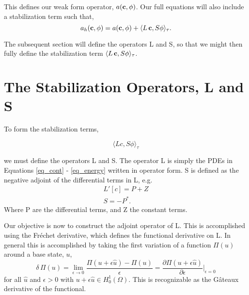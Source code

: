 This defines our weak form operator, $ a({\bf c},{\bf \phi})$. Our full equations will
also include a stabilization term such that,  
\begin{equation}
 a_h({\bf c},{\bf \phi}) = a({\bf c},{\bf \phi}) +  \langle L\,{\bf c},S{\bf \phi} \rangle_\tau. 
\end{equation}

The subsequent section will define the operators L and S, so that we
might then fully define the stabilization term $\langle L\,{\bf c},S{\bf \phi}
\rangle_\tau$. 

%
%
\section{The Stabilization Operators, L and S}


To form the stabilization terms, 

\begin{equation}
 \langle Lc,S\phi \rangle_\tau
\end{equation}

we must define the operators L and S. The operator L is simply the PDEs
in Equations \ref{eq_cont} - \ref{eq_energy} written in operator form. S is
defined as the negative adjoint of the differential terms in L, e.g.
\begin{align}
 L'[c] = P + Z \\
 S = -P^*. 
\end{align}
Where P are the differential terms, and Z the constant terms. 

Our objective is now to construct the adjoint operator of L. This is
accomplished using the Fr\'echet derivative, which defines the
functional derivative on L. In general this is accomplished by taking
the first variation of a function $\Pi(u)$ around a base state, $u$,
\begin{equation}
 \delta\, \Pi(u) = \lim_{\epsilon \to 0} \frac{\Pi(u+\epsilon \hat u) -
  \Pi(u)}{\epsilon} =
  \frac{\partial \Pi(u +\epsilon \hat u)}{\partial \epsilon}
  \bigg|_{\epsilon = 0}
\end{equation}
for all $\hat u$ and $\epsilon > 0$ with $u + \epsilon \hat u \in
H^1_0(\Omega)$. This is recognizable as the G\^{a}teaux
derivative of the functional. 

